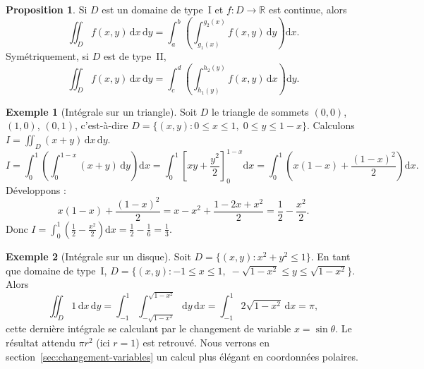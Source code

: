 \documentclass[12pt,a4paper,openany]{book}
\theoremstyle{definition}
\newtheorem{proposition}{Proposition}[chapter]
\newtheorem{exemple}{Exemple}[chapter]
\newcommand{\R}{\mathbb{R}}
\newcommand{\dd}{\mathrm{d}}
\begin{document}
\begin{proposition}\label{prop:integrale-domaine-type-I}
  Si $D$ est un domaine de type~I et $f\colon D \to \R$ est continue,
  alors
  \begin{equation}\label{eq:type-I}
    \iint_D f(x,y)\,\dd x\,\dd y
    = \int_a^b \!\left(\int_{g_1(x)}^{g_2(x)} f(x,y)\,\dd y\right)\dd x.
  \end{equation}
  Symétriquement, si $D$ est de type~II,
  \begin{equation}\label{eq:type-II}
    \iint_D f(x,y)\,\dd x\,\dd y
    = \int_c^d \!\left(\int_{h_1(y)}^{h_2(y)} f(x,y)\,\dd x\right)\dd y.
  \end{equation}
\end{proposition}

\begin{exemple}[Intégrale sur un triangle]
  \label{ex:integrale-triangle}
  Soit $D$ le triangle de sommets $(0,0)$, $(1,0)$, $(0,1)$, c'est-à-dire
  $D = \{(x,y) : 0 \leqslant x \leqslant 1,\; 0 \leqslant y \leqslant 1-x\}$.
  Calculons $\displaystyle I = \iint_D (x+y)\,\dd x\,\dd y$.
  \[
    I = \int_0^1\!\left(\int_0^{1-x}(x+y)\,\dd y\right)\dd x
    = \int_0^1\left[xy + \frac{y^2}{2}\right]_0^{1-x}\dd x
    = \int_0^1\left(x(1-x) + \frac{(1-x)^2}{2}\right)\dd x.
  \]
  Développons :
  \[
    x(1-x) + \frac{(1-x)^2}{2} = x - x^2 + \frac{1-2x+x^2}{2}
    = \frac{1}{2} - \frac{x^2}{2}.
  \]
  Donc $I = \int_0^1\left(\frac{1}{2} - \frac{x^2}{2}\right)\dd x
  = \frac{1}{2} - \frac{1}{6} = \frac{1}{3}$.
\end{exemple}

\begin{exemple}[Intégrale sur un disque]
  \label{ex:integrale-disque}
  Soit $D = \{(x,y) : x^2 + y^2 \leqslant 1\}$. En tant que domaine
  de type~I, $D = \{(x,y) : -1 \leqslant x \leqslant 1,\;
  -\sqrt{1-x^2} \leqslant y \leqslant \sqrt{1-x^2}\}$. Alors
  \[
    \iint_D 1\,\dd x\,\dd y
    = \int_{-1}^{1}\!\int_{-\sqrt{1-x^2}}^{\sqrt{1-x^2}}\dd y\,\dd x
    = \int_{-1}^{1} 2\sqrt{1-x^2}\,\dd x = \pi,
  \]
  cette dernière intégrale se calculant par le changement de variable
  $x = \sin\theta$. Le résultat attendu $\pi r^2$ (ici $r=1$) est
  retrouvé. Nous verrons en section~\ref{sec:changement-variables} un
  calcul plus élégant en coordonnées polaires.
\end{exemple}


\end{document}
